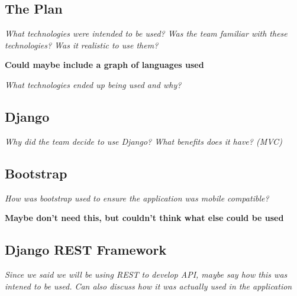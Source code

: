 \documentclass[../dissertation.tex]{subfiles}
\begin{document}
\subsection{The Plan}

\textit{What technologies were intended to be used? Was the team familiar with these technologies? Was it realistic to use them?}

\textbf{Could maybe include a graph of languages used}

\textit{What technologies ended up being used and why?}

\subsection{Django}

\textit{Why did the team decide to use Django? What benefits does it have? (MVC)}

\subsection{Bootstrap}

\textit{How was bootstrap used to ensure the application was mobile compatible?}

\textbf{Maybe don't need this, but couldn't think what else could be used}

\subsection{Django REST Framework}

\textit{Since we said we will be using REST to develop API, maybe say how this was intened to be used. Can also discuss how it was actually used in the application}
\end{document}
